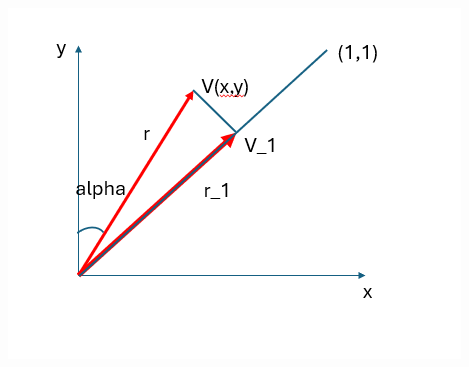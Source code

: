 \documentclass[a4paper]{article}
\begin{document}
\includegraphics[scale = 1]{project2.png}\\
\end{document}
